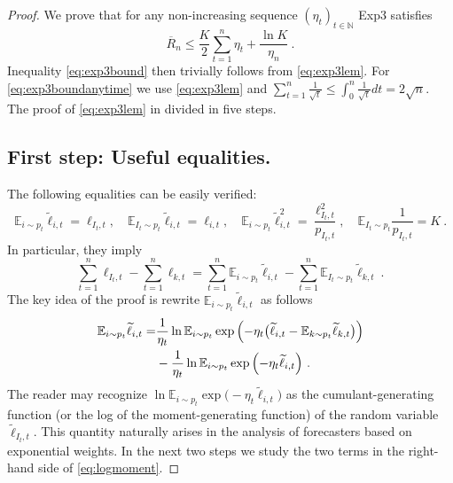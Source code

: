\documentclass[11pt]{hackednow}
\newcommand{\E}{\mathbb{E}}
\newcommand{\N}{\mathbb{N}}
\newcommand{\oR}{\overline{R}}
\renewcommand{\tilde}{\widetilde}
\begin{document}
\begin{proof}
We prove that for any non-increasing sequence $(\eta_t)_{t \in \N}$ Exp3 satisfies
\begin{equation} \label{eq:exp3lem}
\oR_n \leq \frac{K}{2} \sum_{t=1}^n \eta_t + \frac{\ln K}{\eta_n}~.
\end{equation}
%
Inequality \eqref{eq:exp3bound} then trivially follows from \eqref{eq:exp3lem}. For \eqref{eq:exp3boundanytime} we use \eqref{eq:exp3lem} and
$\sum_{t=1}^n \frac{1}{\sqrt{t}} \leq \int_{0}^n \frac{1}{\sqrt{t}} dt = 2 \sqrt{n}$. The proof of \eqref{eq:exp3lem} in divided in five steps.

\subsection*{First step: Useful equalities.}
%
The following equalities can be easily verified:
\begin{equation} \label{eq:equalities}
\E_{i \sim p_t} \tilde{\ell}_{i,t} = \ell_{I_t,t}, \quad \E_{I_t \sim p_t} \tilde{\ell}_{i,t} = \ell_{i,t}, \quad
\E_{i \sim p_t} {\tilde{\ell}}^2_{i,t} = \frac{\ell_{I_t,t}^2}{p_{I_t,t}}, \quad \E_{I_t \sim p_t} \frac{1}{p_{I_t,t}} = K~.
\end{equation}
In particular, they imply
\begin{equation} \label{eq:expregret}
\sum_{t=1}^n \ell_{I_t,t} - \sum_{t=1}^n \ell_{k,t}  = \sum_{t=1}^n \E_{i \sim p_t} \tilde{\ell}_{i,t} - \sum_{t=1}^n \E_{I_t \sim p_t} \tilde{\ell}_{k,t}~.
\end{equation}
The key idea of the proof is rewrite $\E_{i \sim p_t} \tilde{\ell}_{i,t}$ as follows 
\begin{align} 
 \E_{i \sim p_t} \tilde{\ell}_{i,t} = & \frac{1}{\eta_t} \ln \E_{i \sim p_t} \exp{\left(- \eta_t \bigl(\tilde{\ell}_{i,t}  - \E_{k \sim p_t} \tilde{\ell}_{k,t}\bigr) \right)}  \notag \\
&- \frac{1}{\eta_t} \ln \E_{i \sim p_t} \exp{\left(- \eta_t \tilde{\ell}_{i,t} \right)}~. \label{eq:logmoment}
\end{align}
The reader may recognize $\ln \E_{i \sim p_t} \exp{\bigl(- \eta_t \tilde{\ell}_{i,t} \bigr)}$ as the cumulant-generating function (or the log of the moment-generating function) of the random variable $\tilde{\ell}_{I_t,t}$. This quantity naturally arises in the analysis of forecasters based on exponential weights. In the next two steps we study the two terms in the right-hand side of \eqref{eq:logmoment}.


\end{proof}
\end{document}
